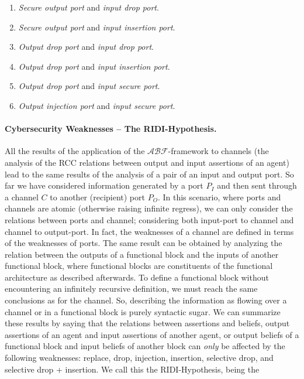 \documentclass[runningheads]{llncs}
\newcommand{\assertionRegion}{\mathcal{A}}
\newcommand{\beliefRegion}{\mathcal{B}}
\newcommand{\factRegion}{\mathcal{F}}
\newcommand{\abftheory}{\assertionRegion\beliefRegion\factRegion}
\begin{document}
\begin{enumerate}[start=6, label={W\arabic*)}]
	\item \emph{Secure output port} and \emph{input drop port}.
	\item \emph{Secure output port} and \emph{input insertion port}.
	\item \emph{Output drop port} and \emph{input drop port}.
	\item \emph{Output drop port} and \emph{input insertion port}.
	\item \emph{Output drop port} and \emph{input secure port}.
	\item \emph{Output injection port} and \emph{input secure port}.
\end{enumerate}

\paragraph{Cybersecurity Weaknesses -- The RIDI-Hypothesis.} 
All the results of the application of the
$\abftheory$-framework to channels (the analysis of the RCC relations
between output and input assertions of an agent)
lead to the same results of the
analysis of a pair of an input and output port.
So far we have
considered information generated by a port $P_I$ and then sent through a
channel $C$ to another (recipient) port $P_O$. In this scenario, where ports and
channels are atomic (otherwise raising infinite regress), we can only
consider the relations between ports and channel; considering both input-port
to channel and channel to output-port.  In fact, the weaknesses of a channel
are defined in terms of the weaknesses of ports.  
The same result can be obtained by analyzing the relation between the outputs
of a functional block and the inputs of another functional block, where
functional blocks are constituents of the functional architecture as described
afterwards.  To define a functional block without encountering an
infinitely recursive definition, we must reach the same conclusions as for the
channel. So, describing the information as flowing over a channel or in
a functional block is purely syntactic sugar.
We can summarize these results by saying that the relations between assertions
and beliefs, output assertions of an agent and input assertions of another
agent, or output beliefs of a functional block and input beliefs of another
block can \emph{only} be affected by the following weaknesses: replace, drop,
injection, insertion, selective drop, and selective drop + insertion. 
We call this the RIDI-Hypothesis, being the
\end{document}

